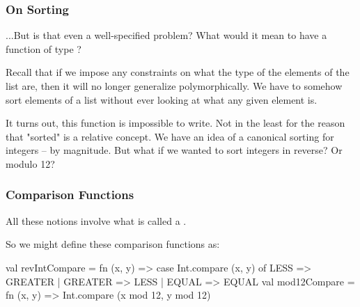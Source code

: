 \documentclass[aspectratio=169, handout]{beamer}
\begin{document}
\begin{frame}[fragile]
  \frametitle{On Sorting}

  ...But is that even a well-specified problem? What would it mean to have a function of
  type ?

  \pause
  \vspace{\fill}

  Recall that if we impose any constraints on what the type of the elements of the list are,
  then it will no longer generalize polymorphically. We have to somehow sort elements of a
  list without ever looking at what any given element is. 

  \pause
  \vspace{\fill}

  It turns out, this function is impossible to write. Not in the least for the reason that
  "sorted" is a relative concept. We have an idea of a canonical sorting for integers --
  by magnitude. But what if we wanted to sort integers in reverse? Or modulo 12?
\end{frame}

\begin{frame}[fragile]
  \frametitle{Comparison Functions}

  All these notions involve what is called a .

  \pause
  \vspace{\fill}


  \pause
  \vspace{\fill}


  \pause
  \vspace{\fill}

  So we might define these comparison functions as:

  \begin{codeblock}
    val revIntCompare = 
      fn (x, y) => case Int.compare (x, y) of 
                     LESS => GREATER 
                   | GREATER => LESS
                   | EQUAL => EQUAL
    val mod12Compare = 
      fn (x, y) => Int.compare (x mod 12, y mod 12)
  \end{codeblock}
\end{frame}
\end{document}
